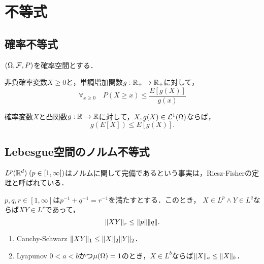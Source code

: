 \documentclass[uplatex,dvipdfmx]{jsreport}
\begin{document}
\section{不等式}

\subsection{確率不等式}

\begin{notation}
    $(\Omega,\mathcal{F},P)$を確率空間とする．
\end{notation}

\begin{proposition}[Markovの不等式]
    非負確率変数$X\ge0$と，単調増加関数$g:\mathbb{R}_+\to\mathbb{R}_+$に対して，
    \[\forall_{x\ge 0}\quad P(X\ge x)\le\frac{E[g(X)]}{g(x)}\]
\end{proposition}

\begin{proposition}[Jensenの不等式]
    確率変数$X$と凸関数$g:\mathbb{R}\to\mathbb{R}$に対して，$X,g(X)\in\mathcal{L}^1(\Omega)$ならば，
    \[g(E[X])\le E[g(X)].\]
\end{proposition}

\subsection{Lebesgue空間のノルム不等式}

\begin{tcolorbox}[colframe=ForestGreen, colback=ForestGreen!10!white,breakable,colbacktitle=ForestGreen!40!white,coltitle=black,fonttitle=\bfseries\sffamily,
title=]
    $L^p(\mathbb{R}^d)\;(p\in[1,\infty])$はノルムに関して完備であるという事実は，Riesz-Fisherの定理と呼ばれている．
\end{tcolorbox}

\begin{proposition}[Holder]
    $p,q,r\in[1,\infty]$は$p^{-1}+q^{-1}=r^{-1}$を満たすとする．このとき，
    $X\in L^p\land Y\in L^q$ならば$XY\in L^r$であって，
    \[\|XY\|_r\le\|p\|\|q\|.\]
\end{proposition}

\begin{corollary}\mbox{}
    \begin{enumerate}
        \item Cauchy-Schwarz $\|XY\|_1\le\|X\|_2\|Y\|_2$．
        \item Lyapunov $0<a<b$かつ$\mu(\Omega)=1$のとき，$X\in L^b$ならば$\|X\|_a\le\|X\|_b$．
    \end{enumerate}
\end{corollary}
\end{document}

